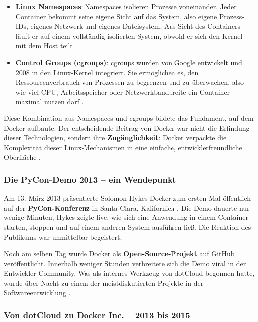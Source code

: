\begin{itemize}
    \item \textbf{Linux Namespaces}: Namespaces isolieren Prozesse 
    voneinander. Jeder Container bekommt seine eigene Sicht auf das 
    System, also eigene Prozess-IDs, eigenes Netzwerk und eigenes 
    Dateisystem. Aus Sicht des Containers läuft er auf einem vollständig 
    isolierten System, obwohl er sich den Kernel mit dem Host teilt 
    \cite{ionos_docker}.

    \item \textbf{Control Groups (cgroups)}: cgroups wurden von Google 
    entwickelt und 2008 in den Linux-Kernel integriert. Sie ermöglichen 
    es, den Ressourcenverbrauch von Prozessen zu begrenzen und zu 
    überwachen, also wie viel CPU, Arbeitsspeicher oder Netzwerkbandbreite 
    ein Container maximal nutzen darf \cite{ionos_docker}.
\end{itemize}

Diese Kombination aus Namespaces und cgroups bildete das Fundament, 
auf dem Docker aufbaute. Der entscheidende Beitrag von Docker war 
nicht die Erfindung dieser Technologien, sondern ihre \textbf{Zugänglichkeit}: 
Docker verpackte die Komplexität dieser Linux-Mechanismen in eine 
einfache, entwicklerfreundliche Oberfläche \cite{datacenter_docker}.

\subsubsection{Die PyCon-Demo 2013 – ein Wendepunkt}

Am 13. März 2013 präsentierte Solomon Hykes Docker zum ersten Mal 
öffentlich auf der \textbf{PyCon-Konferenz} in Santa Clara, Kalifornien 
\cite{datacenter_docker}. Die Demo dauerte nur wenige Minuten, Hykes 
zeigte live, wie sich eine Anwendung in einem Container starten, stoppen 
und auf einem anderen System ausführen ließ. Die Reaktion des Publikums 
war unmittelbar begeistert.

Noch am selben Tag wurde Docker als \textbf{Open-Source-Projekt} auf 
GitHub veröffentlicht. Innerhalb weniger Stunden verbreitete sich die 
Demo viral in der Entwickler-Community. Was als internes Werkzeug von 
dotCloud begonnen hatte, wurde über Nacht zu einem der meistdiskutierten 
Projekte in der Softwareentwicklung \cite{datacenter_docker}.

\subsubsection{Von dotCloud zu Docker Inc. – 2013 bis 2015}

